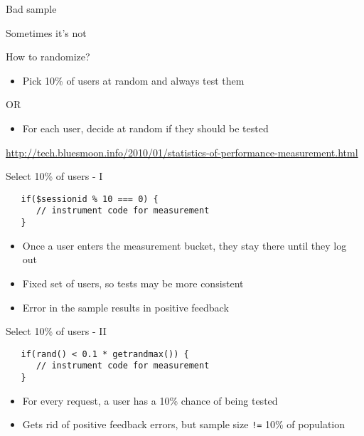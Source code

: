 \documentclass{beamer}
\begin{document}
\begin{frame}{Bad sample}
  \begin{block}{}
  \begin{center}
  Sometimes it's not
  \end{center}
  \end{block}
  \parbox[c][0.4\paperheight]{\paperwidth}{ }
\end{frame}

\begin{frame}{How to randomize?}
  \begin{itemize}
  \item Pick 10\% of users at random and always test them
  \end{itemize}
  \begin{center} \large{OR} \end{center}
  \begin{itemize}
  \item For each user, decide at random if they should be tested
  \end{itemize}
  \href{http://tech.bluesmoon.info/2010/01/statistics-of-performance-measurement.html}{\scriptsize{http://tech.bluesmoon.info/2010/01/statistics-of-performance-measurement.html}}
\end{frame}

\begin{frame}[fragile]{Select 10\% of users - I}
\begin{verbatim}
   if($sessionid % 10 === 0) {
      // instrument code for measurement
   }
\end{verbatim}
  \begin{itemize}
  \item Once a user enters the measurement bucket, they stay there until they log out
  \item Fixed set of users, so tests may be more consistent
  \item Error in the sample results in positive feedback
  \end{itemize}
\end{frame}

\begin{frame}[fragile]{Select 10\% of users - II}
\begin{verbatim}
   if(rand() < 0.1 * getrandmax()) {
      // instrument code for measurement
   }
\end{verbatim}
  \begin{itemize}
  \item For every request, a user has a 10\% chance of being tested
  \item Gets rid of positive feedback errors, but sample size \texttt{!=} 10\% of population
  \end{itemize}
\end{frame}
\end{document}
